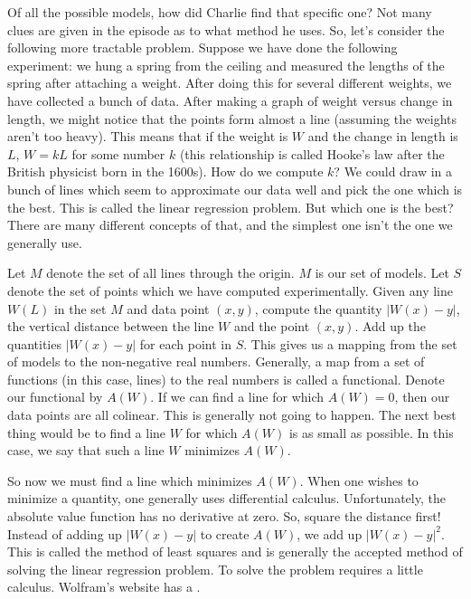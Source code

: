 

Of all the possible models, how did Charlie find that specific one? Not many clues are given in the episode as to what method he uses. So, let's consider the following more tractable problem. Suppose we have done the following experiment: we hung a spring from the ceiling and measured the lengths of the spring after attaching a weight. After doing this for several different weights, we have collected a bunch of data. After making a graph of weight versus change in length, we might notice that the points form almost a line (assuming the weights aren't too heavy). This means that if the weight is $W$ and the change in length is $L$, $W= kL$ for some number $k$ (this relationship is called Hooke's law after the British physicist born in the 1600s). How do we compute $k$? We could draw in a bunch of lines which seem to approximate our data well and pick the one which is the best. This is called the linear regression problem. But which one is the best? There are many different concepts of that, and the simplest one isn't the one we generally use.


Let $M$ denote the set of all lines through the origin. $M$ is our set of models. Let $S$ denote the set of points which we have computed experimentally. Given any line $W(L)$ in the set $M$ and data point $(x,y)$, compute the quantity $|W(x)-y|$, the vertical distance between the line $W$ and the point $(x,y)$.  Add up the quantities $|W(x)-y|$ for each point in $S$. This gives us a mapping from the set of models to the non-negative real numbers. Generally, a map from a set of functions (in this case, lines) to the real numbers is called a functional. Denote our functional by $A(W)$. If we can find a line for which $A(W)= 0$, then our data points are all colinear. This is generally not going to happen. The next best thing would be to find a line $W$ for which $A(W)$ is as small as possible. In this case, we say that such a line $W$ minimizes $A(W)$.


So now we must find a line which minimizes $A(W)$. When one wishes to minimize a quantity, one generally uses differential calculus. Unfortunately, the absolute value function has no derivative at zero.  So, square the distance first! Instead of adding up $|W(x)-y|$ to create $A(W)$, we add up $|W(x)-y|^2$.  This is called the method of least squares and is generally the accepted method of solving the linear regression problem. To solve the problem requires a little calculus. Wolfram's website has a .


